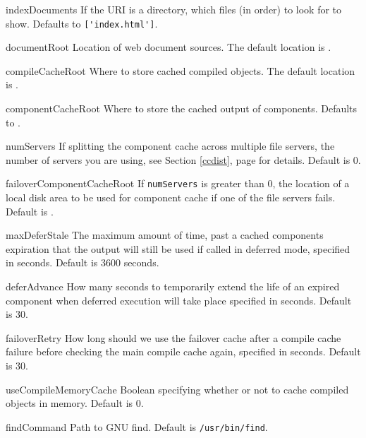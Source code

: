 \documentclass{manual}
\begin{document}
\begin{datadesc}{indexDocuments} If the URI is a directory, which files (in
order) to look for to show.  Defaults to \verb!['index.html']!.
\end{datadesc}
\begin{datadesc}{documentRoot} Location of web document sources.  The default
location is .
\end{datadesc}
\begin{datadesc}{compileCacheRoot}  Where to store cached compiled
objects.  The default location is .
\end{datadesc}
\begin{datadesc}{componentCacheRoot}  Where to store the cached output of
components.  Defaults to .
\end{datadesc}
\begin{datadesc}{numServers} If splitting the component cache across
multiple file servers, the number of servers you are using, see Section
\ref{ccdist}, page \pageref{ccdist} for details.   Default is 0.
\end{datadesc}
\begin{datadesc}{failoverComponentCacheRoot} If \texttt{numServers} is greater
than 0, the location of a local disk area to be used for component
cache if one of the file servers fails.  Default is
.
\end{datadesc}
\begin{datadesc}{maxDeferStale} The maximum amount of time, past a cached
components expiration that the output will still be used if called in
deferred mode, specified in seconds.  Default is 3600 seconds.
\end{datadesc}
\begin{datadesc}{deferAdvance} How many seconds to temporarily extend
the life of an expired component when deferred execution will take
place specified in seconds.  Default is 30.
\end{datadesc}
\begin{datadesc}{failoverRetry} How long should we use the failover cache after
a compile cache failure before checking the main compile cache again,
specified in seconds.  Default is 30.
\end{datadesc}
\begin{datadesc}{useCompileMemoryCache} Boolean specifying whether or not to
cache compiled objects in memory.  Default is 0.
\end{datadesc}
\begin{datadesc}{findCommand} Path to GNU find.  Default is
\verb!/usr/bin/find!. 
\end{datadesc}
\end{document}
